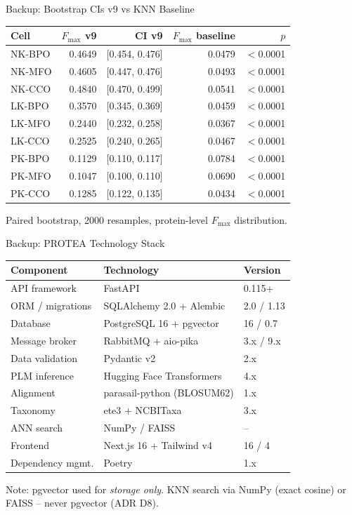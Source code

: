 \documentclass[12pt, aspectratio=169]{beamer}
\newcommand{\fmax}{$F_{\max}$}
\begin{document}
\begin{frame}{Backup: Bootstrap CIs v9 vs KNN Baseline}
  \begin{center}
    \begin{tabular}{l rr r r}
      \toprule
      Cell & $F_{\max}$ v9 & CI v9 & $F_{\max}$ baseline & $p$ \\
      \midrule
      NK-BPO & 0.4649 & [0.454, 0.476] & 0.0479 & $<$0.0001 \\
      NK-MFO & 0.4605 & [0.447, 0.476] & 0.0493 & $<$0.0001 \\
      NK-CCO & 0.4840 & [0.470, 0.499] & 0.0541 & $<$0.0001 \\
      LK-BPO & 0.3570 & [0.345, 0.369] & 0.0459 & $<$0.0001 \\
      LK-MFO & 0.2440 & [0.232, 0.258] & 0.0367 & $<$0.0001 \\
      LK-CCO & 0.2525 & [0.240, 0.265] & 0.0467 & $<$0.0001 \\
      PK-BPO & 0.1129 & [0.110, 0.117] & 0.0784 & $<$0.0001 \\
      PK-MFO & 0.1047 & [0.100, 0.110] & 0.0690 & $<$0.0001 \\
      PK-CCO & 0.1285 & [0.122, 0.135] & 0.0434 & $<$0.0001 \\
      \bottomrule
    \end{tabular}
  \end{center}
  Paired bootstrap, 2000 resamples, protein-level \fmax{} distribution.
\end{frame}

\begin{frame}{Backup: PROTEA Technology Stack}
  \begin{center}
    \begin{tabular}{lll}
      \toprule
      Component & Technology & Version \\
      \midrule
      API framework & FastAPI & 0.115+ \\
      ORM / migrations & SQLAlchemy 2.0 + Alembic & 2.0 / 1.13 \\
      Database & PostgreSQL 16 + pgvector & 16 / 0.7 \\
      Message broker & RabbitMQ + aio-pika & 3.x / 9.x \\
      Data validation & Pydantic v2 & 2.x \\
      PLM inference & Hugging Face Transformers & 4.x \\
      Alignment & parasail-python (BLOSUM62) & 1.x \\
      Taxonomy & ete3 + NCBITaxa & 3.x \\
      ANN search & NumPy / FAISS & -- \\
      Frontend & Next.js 16 + Tailwind v4 & 16 / 4 \\
      Dependency mgmt. & Poetry & 1.x \\
      \bottomrule
    \end{tabular}
  \end{center}
  {\small Note: pgvector used for \emph{storage only}. KNN search via NumPy (exact cosine) or FAISS -- never pgvector (ADR D8).}
\end{frame}
\end{document}
